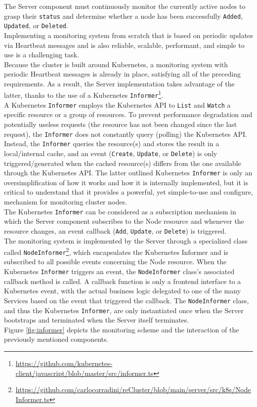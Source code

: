 The Server component must continuously monitor the currently active nodes to grasp
their \texttt{status} and determine whether a node has been successfully \texttt{Added},
\texttt{Updated}, or \texttt{Deleted}. \\ %
Implementing a monitoring system from scratch that is based on periodic updates via
Heartbeat messages and is also reliable, scalable, performant, and simple to use
is a challenging task. \\ %
Because the cluster is built around Kubernetes, a monitoring system with periodic
Heartbeat messages is already in place, satisfying all of the preceding
requirements. As a result, the Server implementation takes advantage of the
latter, thanks to the use of a Kubernetes \texttt{Informer}\footnote{\url{https://github.com/kubernetes-client/javascript/blob/master/src/informer.ts}}.
\\ %
A Kubernetes \texttt{Informer} employs the Kubernetes API to \texttt{List} and
\texttt{Watch} a specific resource or a group of resources. To prevent
performance degradation and potentially useless requests (the resource has not been
changed since the last request), the \texttt{Informer} does not constantly query
(polling) the Kubernetes API. Instead, the \texttt{Informer} queries the resource(s)
and stores the result in a local/internal cache, and an event (\texttt{Create},
\texttt{Update}, or \texttt{Delete}) is only triggered/generated when the cached
resource(s) differs from the one available through the Kubernetes API. The
latter outlined Kubernetes \texttt{Informer} is only an oversimplification of how
it works and how it is internally implemented, but it is critical to understand
that it provides a powerful, yet simple-to-use and configure, mechanism for
monitoring cluster nodes. \\ %
The Kubernetes \texttt{Informer} can be considered as a subscription mechanism in
which the Server component subscribes to the Node resource and whenever the resource
changes, an event callback (\texttt{Add}, \texttt{Update}, or \texttt{Delete}) is
triggered. \\ %
The monitoring system is implemented by the Server through a specialized class called
\texttt{NodeInformer}\footnote{\url{https://github.com/carlocorradini/reCluster/blob/main/server/src/k8s/NodeInformer.ts}},
which encapsulates the Kubernetes Informer and is subscribed to all possible events
concerning the Node resource. When the Kubernetes \texttt{Informer} triggers an event,
the \texttt{NodeInformer} class's associated callback method is called. A
callback function is only a frontend interface to a Kubernetes event, with the actual
business logic delegated to one of the many Services based on the event that triggered
the callback. The \texttt{NodeInformer} class, and thus the Kubernetes \texttt{Informer},
are only instantiated once when the Server bootstraps and terminated when the
Server itself terminates. \\ %
Figure \ref{fig:informer} depicts the monitoring scheme and the interaction of
the previously mentioned components.

